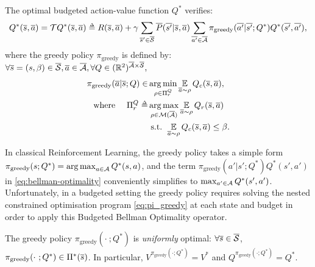 \begin{theorem}
	\begin{leftbar}[theorembar]
	\label{thm:bellman-optimality}
	The optimal budgeted action-value function $Q^*$ verifies:
	\begin{equation}
	\label{eq:bellman-optimality}
	Q^{*}(\os, \oa) = \cT Q^{*}(\os, \oa) \eqdef R(\os, \oa) + \gamma \sum_{\os'\in\ocS} \ov{P}(\ov{s'} | \os, \oa)\sum_{\ov{a'}\in \ocA} \pi_\text{greedy}(\ov{a'}|\ov{s'}; Q^*) Q^{*}(\ov{s'}, \ov{a'}),
	\end{equation}
	where the greedy policy $\pi_\text{greedy}$ is defined by: $\forall \overline{s}=(s,\beta)\in \overline{\mathcal{S}}, \overline{a}\in 
	\overline{\mathcal{A}}, \forall Q\in(\mathbb{R}^2)^{\overline{\mathcal{A}}\times\overline{\mathcal{S}}},$
	\begin{subequations}
		\label{eq:pi_greedy}
		\begin{align}
		\pi_\text{greedy}(\oa|\os; Q) \in &\argmin_{\rho\in\Pi_r^Q} \expectedvalueover{\oa\sim\rho}Q_c(\os, \oa), \label{eq:pi_greedy_cost}\\
		\text{where }\quad\Pi_r^Q \eqdef &\argmax_{\rho\in\cM(\ocA)} \expectedvalueover{\oa\sim\rho} Q_r(\os, \oa) \label{eq:pi_greedy_reward}\\
		& \text{ s.t. }  \expectedvalueover{\oa\sim\rho} Q_c(\os, \oa) \leq \beta. \label{eq:pi_greedy_constraint}
		\end{align}
	\end{subequations}
	\end{leftbar}
\end{theorem}

\begin{remark}
	\begin{leftbar}[remarkbar]
	\label{rmk:greedy}
	In classical Reinforcement Learning, the greedy policy takes a simple form $\pi_\text{greedy}(s; Q^*) = \operatorname*{arg\,max}_{a\in\mathcal{A}} Q^*(s, a)$, and the term $\pi_\text{greedy}(a'|s';Q^*) Q^{*}(s', a')$ in \eqref{eq:bellman-optimality} conveniently simplifies to $\max_{a'\in \mathcal{A}} Q^*(s', a')$. Unfortunately, in a budgeted setting the greedy policy requires solving the nested constrained optimisation program \eqref{eq:pi_greedy} at each state and budget in order to apply this Budgeted Bellman Optimality operator.
	\end{leftbar}
\end{remark}

\begin{proposition}
	\begin{leftbar}[propositionbar]
	\label{prop:greedy_optimal}
	The greedy policy $\pi_\text{greedy}(\cdot~; Q^*)$ is \emph{uniformly} optimal: $\forall\overline{s}\in\overline{\mathcal{S}}$, $\pi_\text{greedy}(\cdot~; Q^*)\in\Pi^*(\overline{s})$. In particular, $V^{\pi_\text{greedy}(\cdot; Q^*)} = V^*$ and $Q^{\pi_\text{greedy}(\cdot; Q^*)}= Q^*$.
	\end{leftbar}
\end{proposition}

